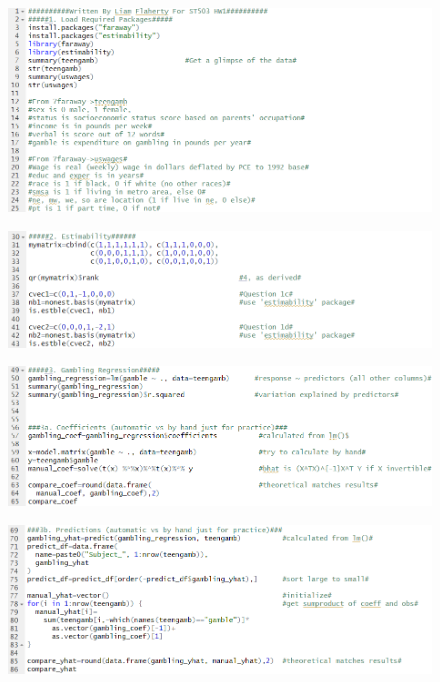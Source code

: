 \documentclass[12pt, letterpaper]{article}
\theoremstyle{definition}
\numberwithin{equation}{section}
\newcommand{\+}[1]{+_{\scalebox{.375}{#1}}}
\newcommand{\1}{\mathbbm{1}}
\begin{document}
\begin{figure}[H]
	\centering
	\includegraphics[width=14cm]{Gambling R Code 1}
\end{figure}
\begin{figure}[H]
	\centering
	\includegraphics[width=14cm]{Gambling R Code 2}
\end{figure}
\begin{figure}[H]
	\centering
	\includegraphics[width=14cm]{Gambling R Code 3}
\end{figure}
\begin{figure}[H]
	\centering
	\includegraphics[width=14cm]{Gambling R Code 4}
\end{figure}
\end{document}
